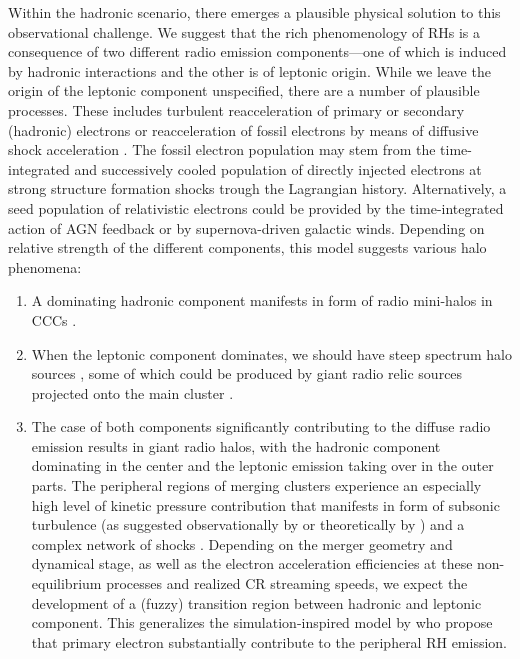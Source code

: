 \documentclass[useAMS,usenatbib]{mn2e}
\begin{document}
Within the hadronic scenario, there emerges a plausible physical solution to
this observational challenge. We suggest that the rich phenomenology of RHs is a
consequence of two different radio emission components---one of which is induced
by hadronic interactions and the other is of leptonic origin. While we leave the
origin of the leptonic component unspecified, there are a number of plausible
processes. These includes turbulent reacceleration of primary or secondary (hadronic)
electrons \citep{2010arXiv1008.0184B} or reacceleration of fossil electrons by
means of diffusive shock acceleration \citep{kang11,kang12,pinzke13}.
The fossil electron population may stem from the time-integrated and successively
cooled population of directly injected electrons at strong structure formation
shocks trough the Lagrangian history. Alternatively, a seed population of
relativistic electrons could be provided by the time-integrated action of AGN
feedback or by supernova-driven galactic winds. Depending on relative strength of
the different components, this model suggests various halo phenomena:
\begin{enumerate}
\item A dominating hadronic component  manifests in form of radio mini-halos in
  CCCs \citep{2004A&A...413...17P}.
\item When the leptonic component dominates, we should have steep spectrum halo
  sources \citep[such as A520,][]{2008Natur.455..944B}, some of which could be
  produced by giant radio relic sources projected onto the main cluster
  \citep{2012arXiv1211.3122S}.
\item The case of both components significantly contributing to the diffuse
  radio emission results in giant radio halos, with the hadronic component
  dominating in the center and the leptonic emission taking over in the outer
  parts. The peripheral regions of merging clusters experience an especially
  high level of kinetic pressure contribution \citep{2009ApJ...705.1129L,
    2012ApJ...758...74B} that manifests in form of subsonic turbulence (as
  suggested observationally by \citealp{2004A&A...426..387S} or theoretically by
  \citealp{2006MNRAS.366.1437S,2005MNRAS.364..753D, 2008Sci...320..909R}) and a
  complex network of shocks \citep{2003ApJ...593..599R, 2006MNRAS.367..113P,
    2008MNRAS.385.1211P, 2008ApJ...689.1063S, 2009MNRAS.395.1333V}. Depending on
  the merger geometry and dynamical stage, as well as the electron acceleration
  efficiencies at these non-equilibrium processes and realized CR streaming
  speeds, we expect the development of a (fuzzy) transition region between
  hadronic and leptonic component. This generalizes the simulation-inspired
  model by \cite{2008MNRAS.385.1211P} who propose that primary electron
  substantially contribute to the peripheral RH emission.
\end{enumerate}
\end{document}
